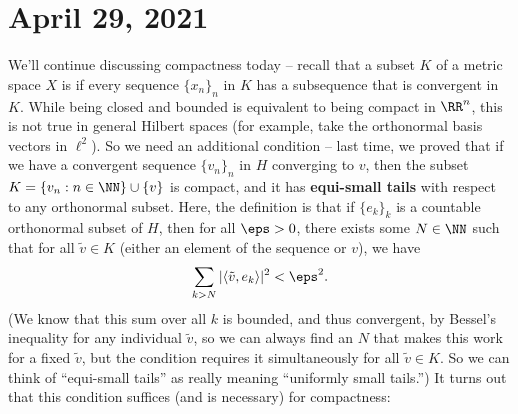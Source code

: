 
\pagebreak\section*{April 29, 2021}

We'll continue discussing compactness today -- recall that a subset $K$ of a metric space $X$ is  if every sequence $\{x_n\}_n$ in $K$ has a subsequence that is convergent in $K$. While being closed and bounded is equivalent to being compact in $\RR^n$, this is not true in general Hilbert spaces (for example, take the orthonormal basis vectors in $\ell^2$). So we need an additional condition -- last time, we proved that if we have a convergent sequence $\{v_n\}_n$ in $H$ converging to $v$, then the subset $K = \{v_n: n \in \NN\} \cup \{v\}$ is compact, and it has \textbf{equi-small tails} with respect to any orthonormal subset. Here, the definition is that if $\{e_k\}_k$ is a countable orthonormal subset of $H$, then for all $\eps > 0$, there exists some $N \in \NN$ such that for all $\tilde{v} \in K$ (either an element of the sequence or $v$), we have 
\[
    \sum_{k > N} |\langle \tilde{v}, e_k \rangle|^2 < \eps^2.
\]
(We know that this sum over all $k$ is bounded, and thus convergent, by Bessel's inequality for any individual $\tilde{v}$, so we can always find an $N$ that makes this work for a fixed $\tilde{v}$, but the condition requires it simultaneously for all $\tilde{v} \in K$. So we can think of ``equi-small tails'' as really meaning ``uniformly small tails.'') It turns out that this condition suffices (and is necessary) for compactness:


